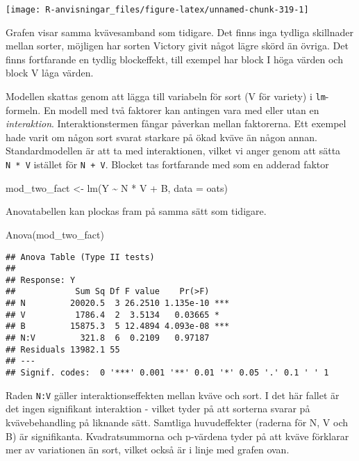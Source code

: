 \documentclass[
]{book}
\newenvironment{Shaded}{\begin{snugshade}}{\end{snugshade}}
\newcommand{\AttributeTok}[1]{\textcolor[rgb]{0.77,0.63,0.00}{#1}}
\newcommand{\FunctionTok}[1]{\textcolor[rgb]{0.00,0.00,0.00}{#1}}
\newcommand{\NormalTok}[1]{#1}
\newcommand{\OtherTok}[1]{\textcolor[rgb]{0.56,0.35,0.01}{#1}}
\newcommand{\SpecialCharTok}[1]{\textcolor[rgb]{0.00,0.00,0.00}{#1}}
\theoremstyle{definition}
\theoremstyle{definition}
\theoremstyle{definition}
\theoremstyle{definition}
\theoremstyle{remark}
\begin{document}
\begin{center}\texttt{[image: R-anvisningar\_files/figure-latex/unnamed-chunk-319-1]} \end{center}

Grafen visar samma kvävesamband som tidigare. Det finns inga tydliga skillnader mellan sorter, möjligen har sorten Victory givit något lägre skörd än övriga. Det finns fortfarande en tydlig blockeffekt, till exempel har block I höga värden och block V låga värden.

Modellen skattas genom att lägga till variabeln för sort (V för variety) i \texttt{lm}-formeln. En modell med två faktorer kan antingen vara med eller utan en \emph{interaktion}. Interaktionstermen fångar påverkan mellan faktorerna. Ett exempel hade varit om någon sort svarat starkare på ökad kväve än någon annan. Standardmodellen är att ta med interaktionen, vilket vi anger genom att sätta \texttt{N\ *\ V} istället för \texttt{N\ +\ V}. Blocket tas fortfarande med som en adderad faktor

\begin{Shaded}
\begin{Highlighting}[]
\NormalTok{mod\_two\_fact }\OtherTok{\textless{}{-}} \FunctionTok{lm}\NormalTok{(Y }\SpecialCharTok{\textasciitilde{}}\NormalTok{ N }\SpecialCharTok{*}\NormalTok{ V }\SpecialCharTok{+}\NormalTok{ B, }\AttributeTok{data =}\NormalTok{ oats)}
\end{Highlighting}
\end{Shaded}

Anovatabellen kan plockas fram på samma sätt som tidigare.

\begin{Shaded}
\begin{Highlighting}[]
\FunctionTok{Anova}\NormalTok{(mod\_two\_fact)}
\end{Highlighting}
\end{Shaded}

\begin{verbatim}
## Anova Table (Type II tests)
## 
## Response: Y
##            Sum Sq Df F value    Pr(>F)    
## N         20020.5  3 26.2510 1.135e-10 ***
## V          1786.4  2  3.5134   0.03665 *  
## B         15875.3  5 12.4894 4.093e-08 ***
## N:V         321.8  6  0.2109   0.97187    
## Residuals 13982.1 55                      
## ---
## Signif. codes:  0 '***' 0.001 '**' 0.01 '*' 0.05 '.' 0.1 ' ' 1
\end{verbatim}

Raden \texttt{N:V} gäller interaktionseffekten mellan kväve och sort. I det här fallet är det ingen signifikant interaktion - vilket tyder på att sorterna svarar på kvävebehandling på liknande sätt. Samtliga huvudeffekter (raderna för N, V och B) är signifikanta. Kvadratsummorna och p-värdena tyder på att kväve förklarar mer av variationen än sort, vilket också är i linje med grafen ovan.
\end{document}
